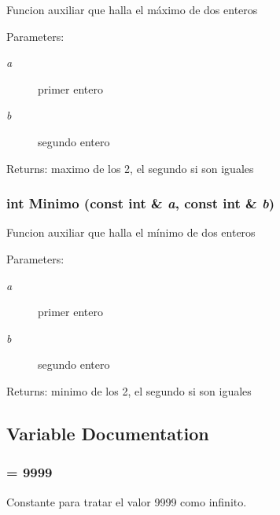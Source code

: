 Funcion auxiliar que halla el máximo de dos enteros \begin{Desc}
\item[Parameters:]
\begin{description}
\item[{\em a}]primer entero \item[{\em b}]segundo entero \end{description}
\end{Desc}
\begin{Desc}
\item[Returns:]maximo de los 2, el segundo si son iguales \end{Desc}
\subsubsection{\setlength{\rightskip}{0pt plus 5cm}int Minimo (const int \& {\em a}, const int \& {\em b})}\label{grafo_8h_ad08456ae6cb5f9aaaee75537f6ef90a}


Funcion auxiliar que halla el mínimo de dos enteros \begin{Desc}
\item[Parameters:]
\begin{description}
\item[{\em a}]primer entero \item[{\em b}]segundo entero \end{description}
\end{Desc}
\begin{Desc}
\item[Returns:]minimo de los 2, el segundo si son iguales \end{Desc}


\subsection{Variable Documentation}
\subsubsection{ = 9999}\label{grafo_8h_e6b53b2e25c3356e411efd5b30a400d4}


Constante para tratar el valor 9999 como infinito. 

